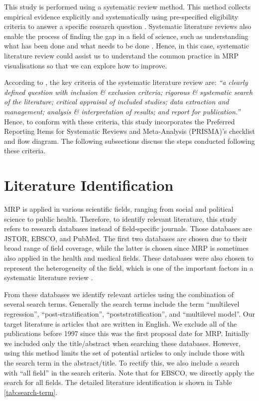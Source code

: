 \documentclass{monashthesis}
\begin{document}
This study is performed using a systematic review method. This method collects empirical evidence explicitly and systematically using pre-specified eligibility criteria to answer a specific research question \autocite{cochrane}. Systematic literature reviews also enable the process of finding the gap in a field of science, such as understanding what has been done and what needs to be done \autocite{LinnenlueckeMartinaK2020Cslr}. Hence, in this case, systematic literature review could assist us to understand the common practice in MRP visualisations so that we can explore how to improve.

According to \textcite{brown_uni}, the key criteria of the systematic literature review are: \emph{``a clearly defined question with inclusion \& exclusion criteria; rigorous \& systematic search of the literature; critical appraisal of included studies; data extraction and management; analysis \& interpretation of results; and report for publication.''} Hence, to conform with these criteria, this study incorporates the Preferred Reporting Items for Systematic Reviews and Meta-Analysis (PRISMA)'s checklist and flow diagram. The following subsections discuss the steps conducted following these criteria.

\hypertarget{literature-identification}{%
\section{Literature Identification}\label{literature-identification}}

MRP is applied in various scientific fields, ranging from social and political science to public health. Therefore, to identify relevant literature, this study refers to research databases instead of field-specific journals. Those databases are JSTOR, EBSCO, and PubMed. The first two databases are chosen due to their broad range of field coverage, while the latter is chosen since MRP is sometimes also applied in the health and medical fields. These databases were also chosen to represent the heterogeneity of the field, which is one of the important factors in a systematic literature review \autocite{SchweizerMarinL2017Apgt}.

From these databases we identify relevant articles using the combination of several search terms. Generally the search terms include the term ``multilevel regression'', ``post-stratification'', ``poststratification'', and ``multilevel model''. Our target literature is articles that are written in English. We exclude all of the publications before 1997 since this was the first proposal date for MRP. Initially we included only the title/abstract when searching these databases. However, using this method limits the set of potential articles to only include those with the search term in the abstract/title. To rectify this, we also include a search with ``all field'' in the search criteria. Note that for EBSCO, we directly apply the search for all fields. The detailed literature identification is shown in Table \ref{tab:search-term}.
\end{document}
